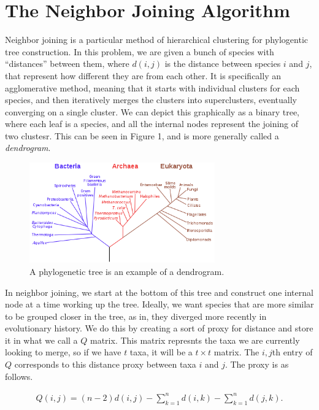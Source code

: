 \section{The Neighbor Joining Algorithm}

Neighbor joining is a particular method of hierarchical clustering for phylogentic tree construction. In this problem, we are given a bunch of species with ``distances'' between them, where $d(i,j)$ is the distance between species $i$ and $j$, that represent how different they are from each other. It is specifically an agglomerative method, meaning that it starts with individual clusters for each species, and then iteratively merges the clusters into superclusters, eventually converging on a single cluster. We can depict this graphically as a binary tree, where each leaf is a species, and all the internal nodes represent the joining of two clustesr. This can be seen in Figure 1, and is more generally called a {\em dendrogram}.

\begin{figure}[h!]\label{tree}
  \caption{A phylogenetic tree is an example of a dendrogram.}
  \begin{center}
    \includegraphics[width=8cm]{phylogenetictree.png}
  \end{center}
\end{figure}

In neighbor joining, we start at the bottom of this tree and construct one internal node at a time working up the tree. Ideally, we want species that are more similar to be grouped closer in the tree, as in, they diverged more recently in evolutionary history. We do this by creating a sort of proxy for distance and store it in what we call a $Q$ matrix. This matrix represnts the taxa we are currently looking to merge, so if we have $t$ taxa, it will be a $t\times t$ matrix. The $i,j$th entry of $Q$ corresponds to this distance proxy between taxa $i$ and $j$. The proxy is as follows.

\begin{align}\label{qformula}
Q(i,j) = (n-2)d(i,j) -\sum_{k=1}^n d(i,k) - \sum_{k=1}^n d(j,k).
\end{align}


